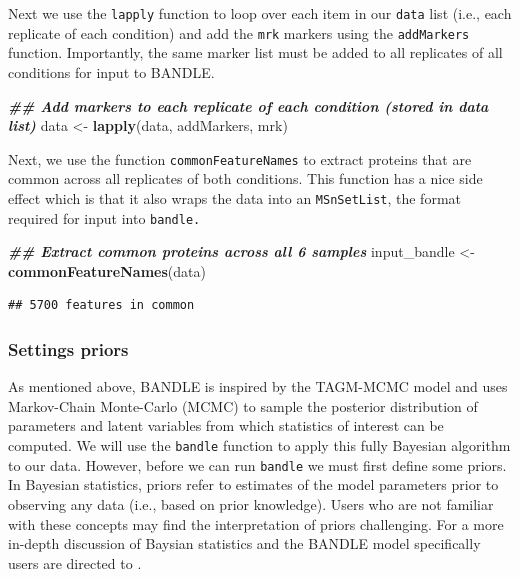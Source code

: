 \documentclass[9pt,a4paper,]{extarticle}
\newenvironment{Shaded}{\begin{snugshade}}{\end{snugshade}}
\newcommand{\DocumentationTok}[1]{\textcolor[rgb]{0.56,0.35,0.01}{\textbf{\textit{#1}}}}
\newcommand{\FunctionTok}[1]{\textcolor[rgb]{0.13,0.29,0.53}{\textbf{#1}}}
\newcommand{\NormalTok}[1]{#1}
\newcommand{\OtherTok}[1]{\textcolor[rgb]{0.56,0.35,0.01}{#1}}
\begin{document}
Next we use the \texttt{lapply} function to loop over each item in our \texttt{data} list (i.e.,
each replicate of each condition) and add the \texttt{mrk} markers using the \texttt{addMarkers}
function. Importantly, the same marker list must be added to all replicates of
all conditions for input to BANDLE.

\begin{Shaded}
\begin{Highlighting}[]
\DocumentationTok{\#\# Add markers to each replicate of each condition (stored in \textquotesingle{}data\textquotesingle{} list)}
\NormalTok{data }\OtherTok{\textless{}{-}} \FunctionTok{lapply}\NormalTok{(data, addMarkers, mrk)}
\end{Highlighting}
\end{Shaded}

Next, we use the function \texttt{commonFeatureNames} to extract proteins that are common
across all replicates of both conditions. This function has a nice side effect
which is that it also wraps the data into an \texttt{MSnSetList}, the format required
for input into \texttt{bandle.}

\begin{Shaded}
\begin{Highlighting}[]
\DocumentationTok{\#\# Extract common proteins across all 6 samples}
\NormalTok{input\_bandle }\OtherTok{\textless{}{-}} \FunctionTok{commonFeatureNames}\NormalTok{(data)}
\end{Highlighting}
\end{Shaded}

\begin{verbatim}
## 5700 features in common
\end{verbatim}

\subsubsection{Settings priors}\label{settings-priors}

As mentioned above, BANDLE is inspired by the TAGM-MCMC model and uses Markov-Chain
Monte-Carlo (MCMC) to sample the posterior distribution of parameters and latent
variables from which statistics of interest can be computed. We will use the \texttt{bandle}
function to apply this fully Bayesian algorithm to our data. However, before we
can run \texttt{bandle} we must first define some priors. In Bayesian statistics, priors
refer to estimates of the model parameters prior to observing any data (i.e., based
on prior knowledge). Users who are not familiar with these concepts may find the
interpretation of priors challenging. For a more in-depth discussion of Baysian
statistics and the BANDLE model specifically users are directed to \citep{vandeSchoot2021, Crook2022}.
\end{document}
